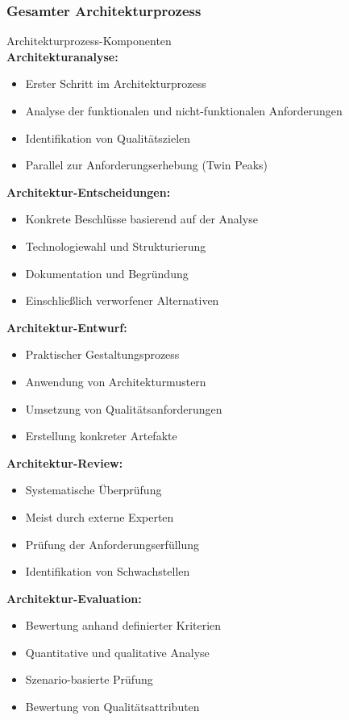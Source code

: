 \columnbreak

\subsubsection{Gesamter Architekturprozess}

\begin{definition}{Architekturprozess-Komponenten}\\
\textbf{Architekturanalyse:}
\begin{itemize}
    \item Erster Schritt im Architekturprozess
    \item Analyse der funktionalen und nicht-funktionalen Anforderungen
    \item Identifikation von Qualitätszielen
    \item Parallel zur Anforderungserhebung (Twin Peaks)
\end{itemize}

\textbf{Architektur-Entscheidungen:}
\begin{itemize}
    \item Konkrete Beschlüsse basierend auf der Analyse
    \item Technologiewahl und Strukturierung
    \item Dokumentation und Begründung
    \item Einschließlich verworfener Alternativen
\end{itemize}

\textbf{Architektur-Entwurf:}
\begin{itemize}
    \item Praktischer Gestaltungsprozess
    \item Anwendung von Architekturmustern
    \item Umsetzung von Qualitätsanforderungen
    \item Erstellung konkreter Artefakte
\end{itemize}

\textbf{Architektur-Review:}
\begin{itemize}
    \item Systematische Überprüfung
    \item Meist durch externe Experten
    \item Prüfung der Anforderungserfüllung
    \item Identifikation von Schwachstellen
\end{itemize}

\textbf{Architektur-Evaluation:}
\begin{itemize}
    \item Bewertung anhand definierter Kriterien
    \item Quantitative und qualitative Analyse
    \item Szenario-basierte Prüfung
    \item Bewertung von Qualitätsattributen
\end{itemize}
\end{definition}

